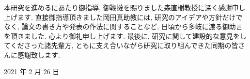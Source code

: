 \newpage
\changeindent{0cm}
\acknowledgements
\changeindent{2cm}

本研究を進めるにあたり御指導, 御鞭撻を賜りました森直樹教授に深く感謝申し上げます.
直接御指導頂きました岡田真助教には, 研究のアイデアや方針だけでなく,
論文の書き方や発表の作法に関することなど, 日頃から多岐に渡る御助言を頂きました.
心より御礼申し上げます.
最後に, 研究に関して建設的な意見をしてくださった諸先輩方,
ともに支え合いながら研究に取り組んできた同期の皆さんに感謝致します.

\begin{flushright}
  2021 年 2 月 26 日
\end{flushright}
